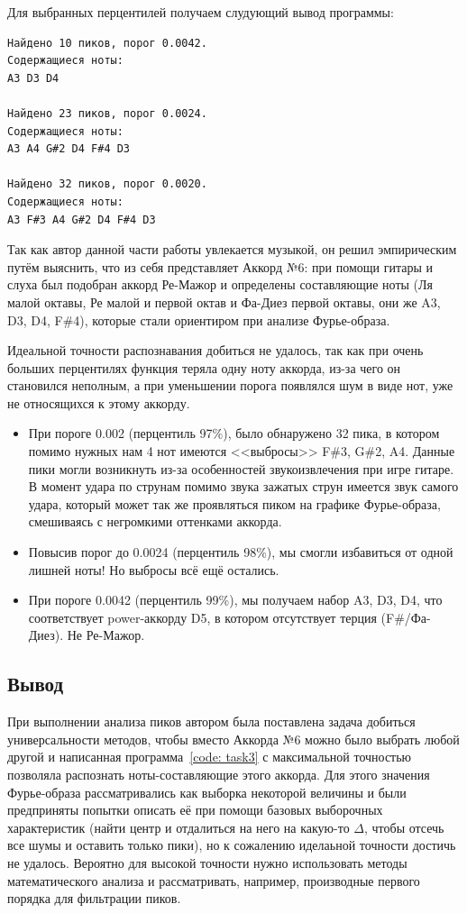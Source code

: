 \documentclass[a4paper, 12pt]{article}
\begin{document}
Для выбранных перцентилей получаем слудующий вывод программы:

\begin{verbatim}
Найдено 10 пиков, порог 0.0042. 
Содержащиеся ноты:
A3 D3 D4

Найдено 23 пиков, порог 0.0024. 
Содержащиеся ноты:
A3 A4 G#2 D4 F#4 D3

Найдено 32 пиков, порог 0.0020. 
Содержащиеся ноты:
A3 F#3 A4 G#2 D4 F#4 D3
\end{verbatim}

Так как автор данной части работы увлекается музыкой, он решил эмпирическим путём выяснить, что из себя представляет Аккорд №6: при помощи гитары и слуха был подобран аккорд Ре-Мажор и определены составляющие ноты (Ля малой октавы, Ре малой и первой октав и Фа-Диез первой октавы, они же A3, D3, D4, F\#4), которые стали ориентиром при анализе Фурье-образа.

Идеальной точности распознавания добиться не удалось, так как при очень больших перцентилях функция теряла одну ноту аккорда, из-за чего он становился неполным, а при уменьшении порога появлялся шум в виде нот, уже не относящихся к этому аккорду.

\begin{itemize}
    \item При пороге 0.002 (перцентиль 97\%), было обнаружено 32 пика, в котором помимо нужных нам 4 нот имеются <<выбросы>> F\#3, G\#2, A4. Данные пики могли возникнуть из-за особенностей звукоизвлечения при игре гитаре. В момент удара по струнам помимо звука зажатых струн имеется звук самого удара, который может так же проявляться пиком на графике Фурье-образа, смешиваясь с негромкими оттенками аккорда.
    \item Повысив порог до 0.0024 (перцентиль 98\%), мы смогли избавиться от одной лишней ноты! Но выбросы всё ещё остались.
    \item При пороге 0.0042 (перцентиль 99\%), мы получаем набор A3, D3, D4, что соответствует power-аккорду D5, в котором отсутствует терция (F\#/Фа-Диез). Не Ре-Мажор.
\end{itemize}

\subsection{Вывод}
При выполнении анализа пиков автором была поставлена задача добиться универсальности методов, чтобы вместо Аккорда №6 можно было выбрать любой другой и написанная программа~\ref{code: task3} с максимальной точностью позволяла распознать ноты-составляющие этого аккорда. Для этого значения Фурье-образа рассматривались как выборка некоторой величины и были предприняты попытки описать её при помощи базовых выборочных характеристик (найти центр и отдалиться на него на какую-то $\Delta$, чтобы отсечь все шумы и оставить только пики), но к сожалению иделаьной точности достичь не удалось. Вероятно для высокой точности нужно использовать методы математического анализа и рассматривать, например, производные первого порядка для фильтрации пиков.
\end{document}

